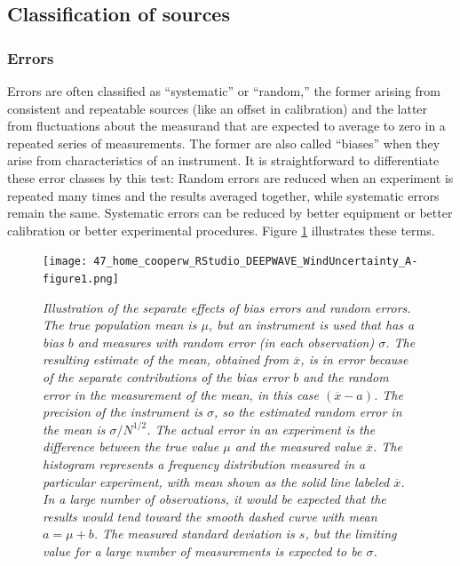 \documentclass[12pt,twoside,english]{article}\usepackage[]{graphicx}\usepackage[]{color}
\let\OrgIndex\index
\renewcommand*{\index}[1]{\OrgIndex{#1}}
\begin{document}
\subsection{Classification of sources}
\subsubsection{Errors}

\label{sec:Classification-of-sources}Errors are often classified as ``systematic'' or ``random,'' the former arising from consistent and repeatable sources (like an offset in calibration) and the latter from fluctuations about the measurand that are expected to average to zero in a repeated series of measurements. The former are also called ``biases'' when they arise from characteristics of an instrument. It is straightforward to differentiate these error classes by this test: Random errors are reduced when an experiment is repeated many times and the results averaged together, while systematic errors remain the same. Systematic errors can be reduced by better equipment or better calibration or better experimental procedures. Figure \ref{fig:IllustrationOfTerms} illustrates these terms. 

\begin{figure}[H] 
\noindent \begin{centering}
\texttt{[image: 47\_home\_cooperw\_RStudio\_DEEPWAVE\_WindUncertainty\_A-figure1.png]}  
\par\end{centering}

\protect\caption[Illustration of the separate effects of bias errors and random errors.]{\emph{\label{fig:IllustrationOfTerms}Illustration of the separate effects of bias errors and random errors. The true population mean is $\mu$, but an instrument is used that has a bias $b$ and measures with random error (in each observation) $\sigma$. The resulting estimate of the mean, obtained from $\overline{x}$, is in error because of the separate contributions of the bias error $b$ and the random error in the measurement of the mean, in this case $(\overline{x}-a)$. The precision of the instrument is $\sigma$, so the estimated random error in the mean is $\sigma/{N}^{1/2}$. The actual error in an experiment is the difference between the true value $\mu$ and the measured value $\overline{x}$. The histogram represents a frequency distribution measured in a particular experiment, with mean shown as the solid line labeled $\overline{x}$. In a large number of observations, it would be expected that the results would tend toward the smooth dashed curve with mean $a=\mu+b$. The measured standard deviation is $s$, but the limiting value for a large number of measurements is expected to be $\sigma$.} } 


\end{figure}
\end{document}
